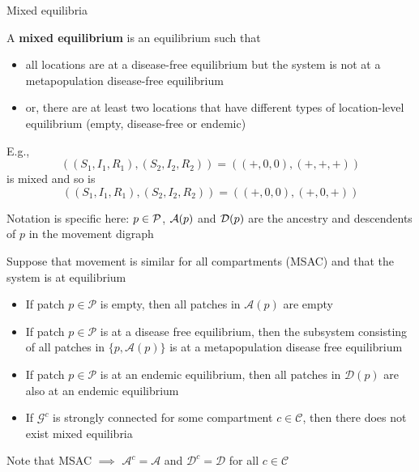 \documentclass[aspectratio=169]{beamer}\usepackage[]{graphicx}\usepackage[]{xcolor}
\begin{document}
\begin{frame}{Mixed equilibria}
	\begin{definition}
		A \textbf{mixed equilibrium} is an equilibrium such that
		\begin{itemize}
			\item all locations are at a disease-free equilibrium but the system is not at a metapopulation disease-free equilibrium
			\item or, there are at least two locations that have different types of location-level equilibrium (empty, disease-free or endemic)
		\end{itemize}
	\end{definition}
	E.g., 
	$$
	((S_1,I_1,R_1),(S_2,I_2,R_2))=((+,0,0),(+,+,+))
	$$
	is mixed and so is
	$$
	((S_1,I_1,R_1),(S_2,I_2,R_2))=((+,0,0),(+,0,+))
	$$
\end{frame}


\begin{frame}
Notation is specific here: $p\in\P$, $\A(p)$ and $\D(p)$ are the ancestry and descendents of $p$ in the movement digraph
	\begin{theorem}
		Suppose that movement is similar for all compartments (MSAC) and that the system is at equilibrium
		\begin{itemize}
			\item If patch $p\in\mathcal{P}$ is empty, then all patches in $\mathcal{A}(p)$ are empty 
			\item If patch $p\in\mathcal{P}$ is at a disease free equilibrium, then the subsystem consisting of all patches in $\{p,\mathcal{A}(p)\}$ is at a metapopulation disease free equilibrium 
			\item If patch $p\in\mathcal{P}$ is at an endemic equilibrium, then all patches in $\mathcal{D}(p)$ are also at an endemic equilibrium
			\item If $\mathcal{G}^c$ is strongly connected for some compartment $c\in\mathcal{C}$, then there does not exist mixed equilibria
		\end{itemize}
	\end{theorem}
	Note that MSAC $\implies$ $\mathcal{A}^c=\mathcal{A}$ and $\mathcal{D}^c=\mathcal{D}$ for all $c\in\mathcal{C}$
\end{frame}
\end{document}
